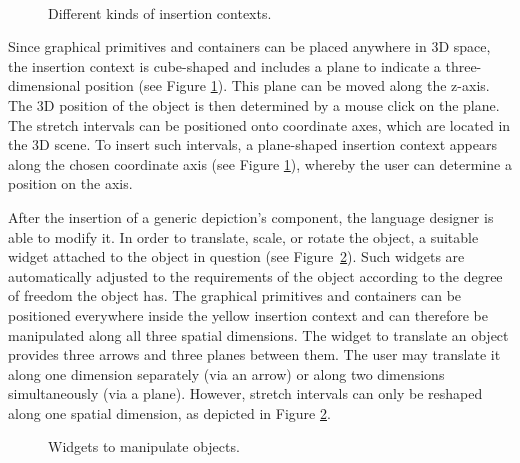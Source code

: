 \documentclass[a4paper]{article}
\begin{document}
\begin{figure}[!ht]
 \begin{center}
  \\
 \end{center}
\caption{Different kinds of insertion contexts.}
\label{fig:insCont}
\end{figure}

Since graphical primitives and containers can be placed anywhere in 3D space, the insertion context is cube-shaped and includes a plane to indicate a three-dimensional position (see Figure \ref{fig:insCont}). This plane can be moved along the $\mathrm{z}$-axis. The 3D position of the object is then determined by a mouse click on the plane. The stretch intervals can be positioned onto coordinate axes, which are located in the 3D scene. To insert such intervals, a plane-shaped insertion context appears along the chosen coordinate axis (see Figure \ref{fig:insCont}), whereby the user can determine a position on the axis.

After the insertion of a generic depiction's component, the language designer is able to modify it. In order to translate, scale, or rotate the object, a suitable widget attached to the object in question (see Figure~\ref{fig:widgets}). Such widgets are automatically adjusted to the requirements of the object according to the degree of freedom the object has. The graphical primitives and containers can be positioned everywhere inside the yellow insertion context and can therefore be manipulated along all three spatial dimensions. The widget to translate an object provides three arrows and three planes between them. The user may translate it along one dimension separately (via an arrow) or along two dimensions simultaneously (via a plane). However, stretch intervals can only be reshaped along one spatial dimension, as depicted in Figure \ref{fig:widgets}.

\begin{figure}[!ht]
 \centerline{
  \hfil
  \hfil
  \hfil
 }
\caption{Widgets to manipulate objects.}
\label{fig:widgets}
\end{figure}
\end{document}
